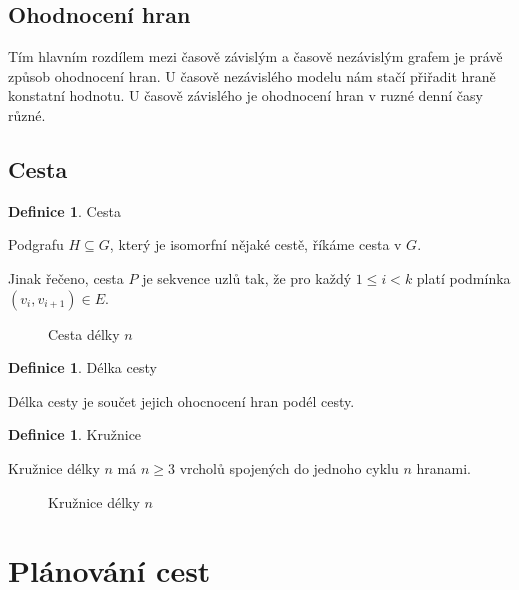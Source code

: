 \documentclass[thesis=M,czech]{FITthesis}[2019/12/23]
\theoremstyle{plain}
\theoremstyle{definition}
\newtheorem{defn}[thm]{Definice} %
\begin{document}

\subsection{Ohodnocení hran}

Tím hlavním rozdílem mezi časově závislým a časově nezávislým grafem je právě způsob ohodnocení hran. U časově nezávislého modelu nám stačí přiřadit hraně konstatní hodnotu. U časově závislého je ohodnocení hran v ruzné denní časy různé.

\subsection{Cesta}

\begin{defn}{Cesta}\label{thm:graf}

Podgrafu $H \subseteq	 G$, který je isomorfní nějaké cestě, říkáme cesta v $G$. 
\end{defn}

Jinak řečeno, cesta $P$ je sekvence uzlů tak, že pro každý $1 \leq	i < k$ platí podmínka $(v_i, v_{i+1}) \in	 E$. 

\begin{figure}[H]\centering
	

	\caption[Cesta délky $n$]{Cesta délky $n$}\label{fig:float}
\end{figure}


\begin{defn}{Délka cesty}\label{thm:graf}

	Délka cesty je součet jejich ohocnocení hran podél cesty.
	\end{defn}

	
\begin{defn}{Kružnice}\label{thm:graf}

Kružnice délky $n$ má $n \geq 3$ vrcholů spojených do jednoho cyklu $n$ hranami.
\end{defn}

\begin{figure}[H]\centering
	

	\caption[Kružnice délky $n$]{Kružnice délky $n$}\label{fig:float}
\end{figure}



\section{Plánování cest}
\end{document}
